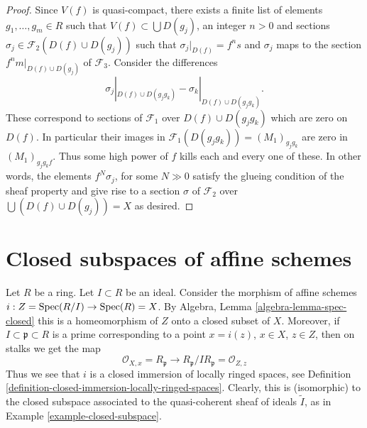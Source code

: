 \begin{proof}
\medskip\noindent
Since $V(f)$ is quasi-compact, there exists a finite list
of elements $g_1, \ldots, g_m \in R$ such that
$V(f) \subset \bigcup D(g_j)$, an integer $n > 0$ and sections
$\sigma_j \in \mathcal{F}_2(D(f) \cup D(g_j))$ such that
$\sigma_j|_{D(f)} = f^n s$ and $\sigma_j$ maps to the section
$f^nm|_{D(f) \cup D(g_j)}$ of $\mathcal{F}_3$.
Consider the differences
$$
\sigma_j|_{D(f) \cup D(g_jg_k)}
-
\sigma_k|_{D(f) \cup D(g_jg_k)}.
$$
These correspond to sections of $\mathcal{F}_1$
over $D(f) \cup D(g_jg_k)$ which are zero
on $D(f)$. In particular their images in
$\mathcal{F}_1(D(g_jg_k)) = (M_1)_{g_jg_k}$
are zero in $(M_1)_{g_jg_kf}$.
Thus some high power of $f$ kills each and every one of these.
In other words, the elements $f^N \sigma_j$, for some $N \gg 0$
satisfy the glueing condition of the sheaf property and
give rise to a section $\sigma $ of $\mathcal{F}_2$
over $\bigcup (D(f) \cup D(g_j)) = X$ as desired.
\end{proof}







\section{Closed subspaces of affine schemes}
\label{section-closed-in-affine}

\begin{example}
\label{example-closed-immersion-affines}
\begin{reference}
\cite[Chapter II, \S 1, no. 31, Proposition 4 and Corollary,
p. 225]{FAC}
\end{reference}
Let $R$ be a ring.
Let $I \subset R$ be an ideal.
Consider the morphism of affine schemes
$i : Z = \mathop{\mathrm{Spec}}(R/I) \to \mathop{\mathrm{Spec}}(R) = X$.
By Algebra, Lemma \ref{algebra-lemma-spec-closed}
this is a homeomorphism of $Z$ onto a closed
subset of $X$. Moreover, if $I \subset \mathfrak p \subset R$
is a prime corresponding to a point $x = i(z)$, $x \in X$,
$z \in Z$, then on stalks we get the map
$$
\mathcal{O}_{X, x} = R_{\mathfrak p}
\longrightarrow
R_{\mathfrak p}/IR_{\mathfrak p} = \mathcal{O}_{Z, z}
$$
Thus we see that $i$ is a closed immersion of locally ringed spaces,
see Definition \ref{definition-closed-immersion-locally-ringed-spaces}.
Clearly, this is (isomorphic) to the closed subspace associated
to the quasi-coherent sheaf of ideals $\widetilde I$, as in
Example \ref{example-closed-subspace}.
\end{example}

